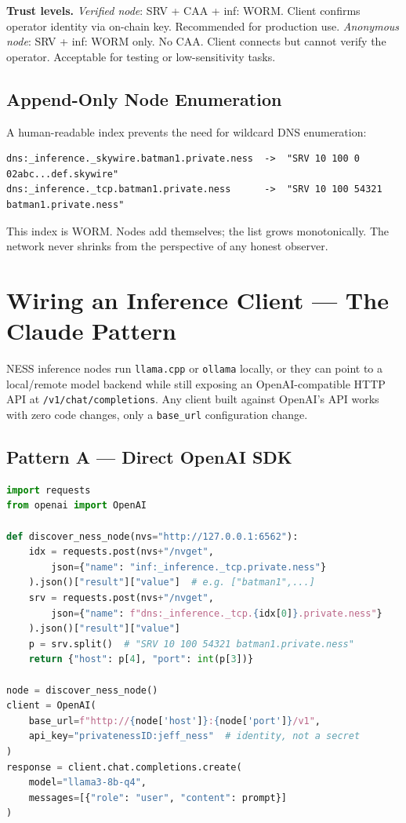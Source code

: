 \documentclass[11pt,a4paper]{article}
\begin{document}
\begin{notebox}
\textbf{Trust levels.}
\textit{Verified node}: SRV + CAA + inf: WORM. Client confirms operator identity via on-chain key. Recommended for production use.
\textit{Anonymous node}: SRV + inf: WORM only. No CAA. Client connects but cannot verify the operator. Acceptable for testing or low-sensitivity tasks.
\end{notebox}

\subsection{Append-Only Node Enumeration}

A human-readable index prevents the need for wildcard DNS enumeration:
\begin{lstlisting}
dns:_inference._skywire.batman1.private.ness  ->  "SRV 10 100 0 02abc...def.skywire"
dns:_inference._tcp.batman1.private.ness      ->  "SRV 10 100 54321 batman1.private.ness"
\end{lstlisting}
This index is WORM. Nodes add themselves; the list grows monotonically. The network never shrinks from the perspective of any honest observer.

\section{Wiring an Inference Client — The Claude Pattern}
\label{sec:wiring}

NESS inference nodes run \texttt{llama.cpp} or \texttt{ollama} locally, or they can point to a local/remote model backend while still exposing an OpenAI-compatible HTTP API at \texttt{/v1/chat/completions}. Any client built against OpenAI's API works with zero code changes, only a \texttt{base\_url} configuration change.

\subsection{Pattern A — Direct OpenAI SDK}

\begin{lstlisting}[language=Python, caption={Direct wiring via OpenAI SDK}]
import requests
from openai import OpenAI

def discover_ness_node(nvs="http://127.0.0.1:6562"):
    idx = requests.post(nvs+"/nvget",
        json={"name": "inf:_inference._tcp.private.ness"}
    ).json()["result"]["value"]  # e.g. ["batman1",...]
    srv = requests.post(nvs+"/nvget",
        json={"name": f"dns:_inference._tcp.{idx[0]}.private.ness"}
    ).json()["result"]["value"]
    p = srv.split()  # "SRV 10 100 54321 batman1.private.ness"
    return {"host": p[4], "port": int(p[3])}

node = discover_ness_node()
client = OpenAI(
    base_url=f"http://{node['host']}:{node['port']}/v1",
    api_key="privatenessID:jeff_ness"  # identity, not a secret
)
response = client.chat.completions.create(
    model="llama3-8b-q4",
    messages=[{"role": "user", "content": prompt}]
)
\end{lstlisting}
\end{document}
